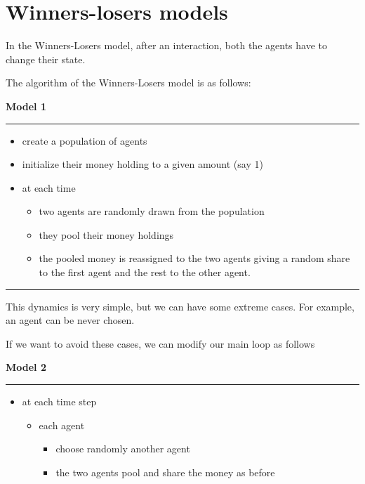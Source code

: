 \documentclass{article}
\providecommand{\tightlist}{%
  \setlength{\itemsep}{0pt}\setlength{\parskip}{0pt}}
\begin{document}
\section{Winners-losers models}
In the Winners-Losers model, after an interaction, both the agents have
to change their state.

The algorithm of the Winners-Losers model is as follows:

\vskip2mm
\noindent\textbf{Model 1}
\vskip1mm
\hrule

\begin{itemize}
\tightlist
\item
  create a population of agents
\item
  initialize their money holding to a given amount (say 1)
\item
  at each time

  \begin{itemize}
  \tightlist
  \item
    two agents are randomly drawn from the population
  \item
    they pool their money holdings
  \item
    the pooled money is reassigned to the two agents giving a random
    share to the first agent and the rest to the other agent.
  \end{itemize}
\end{itemize}
\vskip-2mm
\hrule

\vskip4mm
This dynamics is very simple, but we can have some extreme cases. For
example, an agent can be never chosen.

If we want to avoid these cases, we can modify our main loop as follows

\vskip2mm
\noindent\textbf{Model 2}
\vskip1mm
\hrule

\begin{itemize}
\tightlist
\item
  at each time step

  \begin{itemize}
  \tightlist
  \item
    each agent

    \begin{itemize}
    \tightlist
    \item
      choose randomly another agent
    \item
      the two agents pool and share the money as before
    \end{itemize}
  \end{itemize}
\end{itemize}
\end{document}
